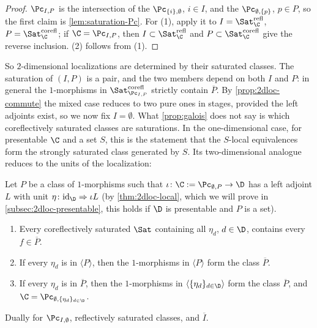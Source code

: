 \begin{proof}
$\Pc_{I,P}$ is the intersection of the $\Pc_{\{i\},\emptyset}$, $i \in I$, and the $\Pc_{\emptyset,\{p\}}$, $p \in P$, so the first claim is \cref{lem:saturation-Pc}. For (1), apply it to $I = \Sat^{\mathrm{refl}}_{\C}$, $P = \Sat^{\mathrm{corefl}}_{\C}$; if $\C = \Pc_{I,P}$, then $I \subset \Sat^{\mathrm{refl}}_{\C}$ and $P \subset \Sat^{\mathrm{corefl}}_{\C}$ give the reverse inclusion. (2) follows from (1).
\end{proof}

So $2$-dimensional localizations are determined by their saturated classes. The saturation of $(I,P)$ is a pair, and the two members depend on both $I$ and $P$: in general the $1$-morphisms in $\Sat^{\mathrm{corefl}}_{\Pc_{I,P}}$ strictly contain $\overline{P}$. By \cref{prop:2dloc-commute} the mixed case reduces to two pure ones in stages, provided the left adjoints exist, so we now fix $I = \emptyset$.
What \cref{prop:galois} does not say is which coreflectively saturated classes are saturations. In the one-dimensional case, for presentable $\C$ and a set $S$, this is the statement that the $S$-local equivalences form the strongly saturated class generated by $S$. Its two-dimensional analogue reduces to the units of the localization:

\begin{thm}
\label{thm:sat-units}
Let $P$ be a class of $1$-morphisms such that $\iota\colon \C := \Pc_{\emptyset,P} \to \D$ has a left adjoint $L$ with unit $\eta\colon \mathrm{id}_{\D} \Rightarrow \iota L$ (by \cref{thm:2dloc-local}, which we will prove in \cref{subsec:2dloc-presentable}, this holds if $\D$ is presentable and $P$ is a set).
\begin{enumerate}
\item Every coreflectively saturated $\Sat$ containing all $\eta_{d}$, $d \in \D$, contains every $f \in \overline{P}$.
\item If every $\eta_{d}$ is in $\langle P \rangle$, then the $1$-morphisms in $\langle P \rangle$ form the class $\overline{P}$.
\item If every $\eta_{d}$ is in $\overline{P}$, then the $1$-morphisms in $\langle \{\eta_{d}\}_{d \in \D} \rangle$ form the class $\overline{P}$, and $\C = \Pc_{\emptyset,\{\eta_{d}\}_{d \in \D}}$.
\end{enumerate}
Dually for $\Pc_{I,\emptyset}$, reflectively saturated classes, and $\overline{I}$.
\end{thm}

